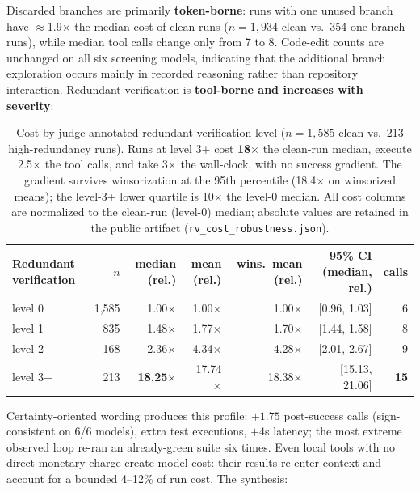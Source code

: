 \documentclass[11pt]{article}
\newcommand{\xd}{$\times$}
\begin{document}
Discarded branches are primarily \textbf{token-borne}: runs with one
unused branch have $\approx$1.9\xd{} the median cost of clean runs
($n=1{,}934$ clean vs.\ 354 one-branch runs), while median tool calls
change only from 7 to 8. Code-edit counts are unchanged on all six screening
models, indicating that the additional branch exploration occurs mainly in
recorded reasoning rather than repository interaction. Redundant
verification is \textbf{tool-borne and increases with severity}:

\begin{table}[ht]\centering\small
\begin{tabular}{lrrrrrr}
\toprule
Redundant verification & $n$ & median (rel.) & mean (rel.) & wins.\ mean (rel.) & 95\% CI (median, rel.) & calls \\
\midrule
level 0 & 1{,}585 & 1.00\xd & 1.00\xd & 1.00\xd & [0.96, 1.03] & 6 \\
level 1 & 835 & 1.48\xd & 1.77\xd & 1.70\xd & [1.44, 1.58] & 8 \\
level 2 & 168 & 2.36\xd & 4.34\xd & 4.28\xd & [2.01, 2.67] & 9 \\
level 3+ & 213 & \textbf{18.25\xd} & 17.74\xd & 18.38\xd & [15.13, 21.06] & \textbf{15} \\
\bottomrule
\end{tabular}
\caption{Cost by judge-annotated redundant-verification level
($n=1{,}585$ clean vs.\ 213 high-redundancy runs). Runs at level 3+ cost
\textbf{18\xd} the clean-run median, execute 2.5\xd{} the tool calls, and
take 3\xd{} the wall-clock, with no success gradient. The gradient
survives winsorization at the 95th percentile (18.4\xd{} on winsorized
means); the level-3+ lower quartile is 10\xd{} the level-0 median.
All cost columns are normalized to the clean-run (level-0) median;
absolute values are retained in the public artifact
(\texttt{rv\_cost\_robustness.json}).}
\end{table}

Certainty-oriented wording produces this profile: $+1.75$ post-success
calls (sign-consistent on 6/6 models), extra test executions, $+4$s
latency; the most extreme observed loop re-ran an already-green suite six times.
Even local tools with no direct monetary charge create model cost: their results re-enter context
and account for a bounded 4--12\% of run cost. The synthesis:
\end{document}
